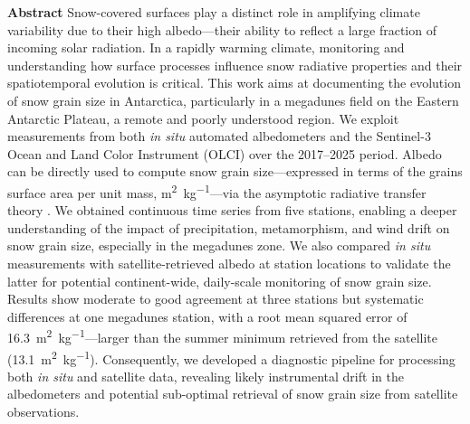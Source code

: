 \documentclass[11pt,a4paper]{article}
\newcommand{\ssaunit}{\meter\squared\per\kilo\gram}
\begin{document}
\thispagestyle{plain}
\vspace{-1cm}
\textbf{\large{}\selectfont Abstract\quad}
Snow-covered surfaces play a distinct role in amplifying climate variability due to their high albedo---their ability to reflect a large fraction of incoming solar radiation. In a rapidly warming climate, monitoring and understanding how surface processes influence snow radiative properties and their spatiotemporal evolution is critical. This work aims at documenting the evolution of snow grain size in Antarctica, particularly in a megadunes field on the Eastern Antarctic Plateau, a remote and poorly understood region. We exploit measurements from both \emph{in situ} automated albedometers and the Sentinel-3 Ocean and Land Color Instrument (OLCI) over the 2017--2025 period. Albedo can be directly used to compute snow grain size---expressed in terms of the grains surface area per unit mass, \unit{\ssaunit}---via the asymptotic radiative transfer theory \parencite{kokhanovskyScatteringOpticsSnow2004}. We obtained continuous time series from five stations, enabling a deeper understanding of the impact of precipitation, metamorphism, and wind drift on snow grain size, especially in the megadunes zone. We also compared \emph{in situ} measurements with satellite-retrieved albedo at station locations to validate the latter for potential continent-wide, daily-scale monitoring of snow grain size. Results show moderate to good agreement at three stations but systematic differences at one megadunes station, with a root mean squared error of \qty{16.3}{\ssaunit}---larger than the summer minimum retrieved from the satellite (\qty{13.1}{\ssaunit}). Consequently, we developed a diagnostic pipeline for processing both \emph{in situ} and satellite data, revealing likely instrumental drift in the albedometers and potential sub-optimal retrieval of snow grain size from satellite observations.
\end{document}

